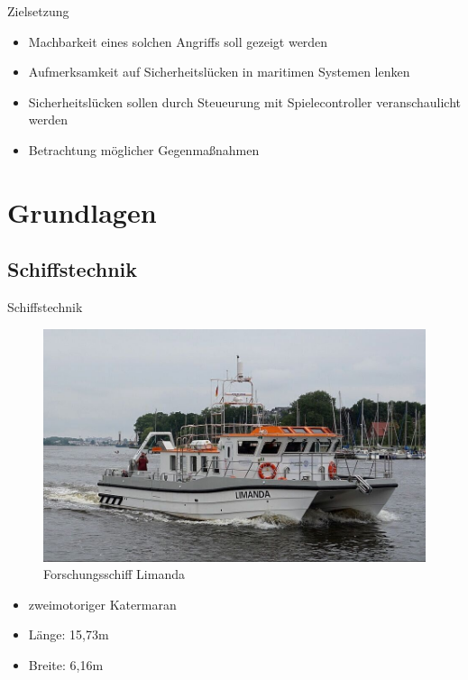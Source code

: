 \documentclass[usenames, dvipsnames, aspectratio=75]{beamer}
\begin{document}
    \begin{frame}{Zielsetzung}
        \begin{itemize}
            \item Machbarkeit eines solchen Angriffs soll gezeigt werden
            \item Aufmerksamkeit auf Sicherheitslücken in maritimen Systemen lenken
            \item Sicherheitslücken sollen durch Steueurung mit Spielecontroller veranschaulicht werden
            \item Betrachtung möglicher Gegenmaßnahmen
        \end{itemize}
    \end{frame}

\section{Grundlagen}

\subsection{Schiffstechnik}
\begin{frame}{Schiffstechnik}
    \begin{figure}
        \centering
        \includegraphics[width=0.6\linewidth]{assets/limanda.png}
        \caption{Forschungsschiff Limanda}
    \end{figure}
    \begin{itemize}
        \item zweimotoriger Katermaran
        \item Länge: 15,73m 
        \item Breite: 6,16m
    \end{itemize}
\end{frame}
\end{document}
